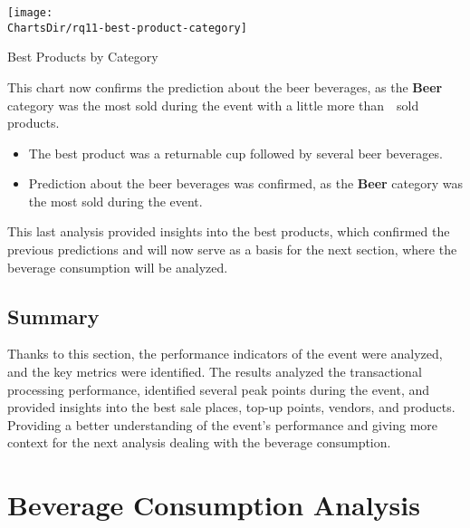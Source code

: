 \begin{chart}[h]
	\centering
	\texttt{[image: \\ChartsDir/rq11-best-product-category]}
	\caption{ Best Products by Category}
	\label{chart:best-product-category}
	\source
\end{chart}

This chart now confirms the prediction about the beer beverages, as the \textbf{Beer} category was the most sold during the event with a little more than~~sold products.

\begin{keytakeaways}
	\begin{itemize}
		\item The best product was a returnable cup followed by several beer beverages.
		\item Prediction about the beer beverages was confirmed, as the \textbf{Beer} category was the most sold during the event.
	\end{itemize}
\end{keytakeaways}

This last analysis provided insights into the best products, which confirmed the previous predictions and will now serve as a basis for the next section, where the beverage consumption will be analyzed.


\subsection{Summary}
\label{subsec:analysis-performance-indicators-summary}

Thanks to this section, the performance indicators of the event were analyzed, and the key metrics were identified.
The results analyzed the transactional processing performance, identified several peak points during the event, and provided insights into the best sale places, top-up points, vendors, and products.
Providing a better understanding of the event's performance and giving more context for the next analysis dealing with the beverage consumption.


\pagebreak[4]



\section{Beverage Consumption Analysis}
\label{sec:analysis-beverage-consumption}

